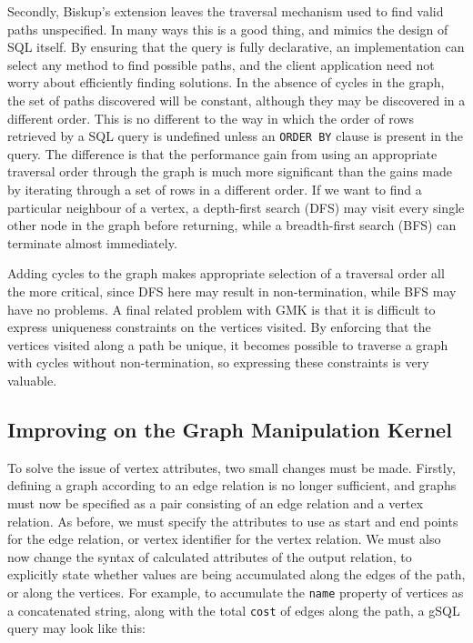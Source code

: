 Secondly, Biskup's extension leaves the traversal mechanism used to find valid
paths unspecified. In many ways this is a good thing, and mimics the design of
SQL itself. By ensuring that the  query is fully declarative, an
implementation can select any method to find possible paths, and the client
application need not worry about efficiently finding solutions. In the absence
of cycles in the graph, the set of paths discovered will be constant, although
they may be discovered in a different order. This is no different to the way
in which the order of rows retrieved by a SQL query is undefined unless an
\texttt{ORDER BY} clause is present in the query. The difference is that the
performance gain from using an appropriate traversal order through the graph
is much more significant than the gains made by iterating through a set of
rows in a different order. If we want to find a particular neighbour of a
vertex, a depth-first search (DFS) may visit every single other node in the
graph before returning, while a breadth-first search (BFS) can terminate
almost immediately. 

Adding cycles to the graph makes appropriate selection of a traversal order
all the more critical, since DFS here may result in non-termination, while
BFS may have no problems. A final related problem with GMK is that it is
difficult to express uniqueness constraints on the vertices visited. By
enforcing that the vertices visited along a path be unique, it becomes
possible to traverse a graph with cycles without non-termination, so
expressing these constraints is very valuable.



\subsection{Improving on the Graph Manipulation Kernel}

To solve the issue of vertex attributes, two small changes must be made.
Firstly, defining a graph according to an edge relation is no longer
sufficient,  and graphs must now be specified as a pair consisting of an edge
relation and a vertex relation. As before, we must specify the attributes to
use as start and end points for the edge relation, or vertex identifier for
the vertex relation. We must also now change the syntax of calculated
attributes of the output relation, to explicitly state whether values are
being accumulated along the edges of the path, or along the vertices. For
example, to accumulate the \texttt{name} property of vertices as a
concatenated string, along with the total \texttt{cost} of edges along the
path, a gSQL query may look like this:


